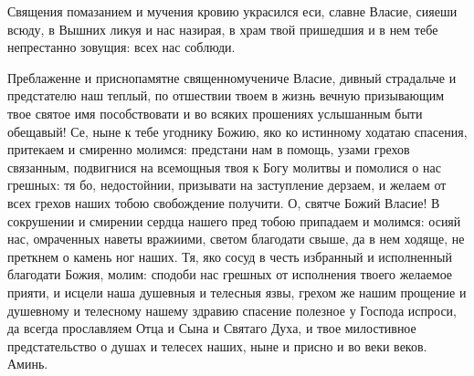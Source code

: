 


Священия помазанием и мучения кровию украсился еси, славне Власие, сияеши всюду, в Вышних ликуя и нас назирая, в храм твой пришедшия и в нем тебе непрестанно зовущия: всех нас соблюди.




Преблаженне и приснопамятне священномучениче Власие, дивный страдальче и предстателю наш теплый, по отшествии твоем в жизнь вечную призывающим твое святое имя пособствовати и во всяких прошениях услышанным быти обещавый! Се, ныне к тебе угоднику Божию, яко ко истинному ходатаю спасения, притекаем и смиренно молимся: предстани нам в помощь, узами грехов связанным, подвигнися на всемощныя твоя к Богу молитвы и помолися о нас грешных: тя бо, недостойнии, призывати на заступление дерзаем, и желаем от всех грехов наших тобою свобождение получити. О, святче Божий Власие! В сокрушении и смирении сердца нашего пред тобою припадаем и молимся: осияй нас, омраченных наветы вражиими, светом благодати свыше, да в нем ходяще, не преткнем о камень ног наших. Тя, яко сосуд в честь избранный и исполненный благодати Божия, молим: сподоби нас грешных от исполнения твоего желаемое прияти, и исцели наша душевныя и телесныя язвы, грехом же нашим прощение и душевному и телесному нашему здравию спасение полезное у Господа испроси, да всегда прославляем Отца и Сына и Святаго Духа, и твое милостивное предстательство о душах и телесех наших, ныне и присно и во веки веков. Аминь.
\longpage{}\mychapterending
